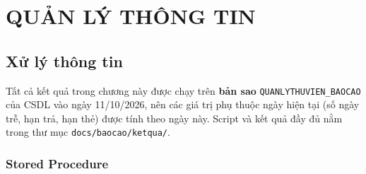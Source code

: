\documentclass[13pt,a4paper,oneside]{extreport}
\begin{document}
\chapter{QUẢN LÝ THÔNG TIN}
\section{Xử lý thông tin}
Tất cả kết quả trong chương này được chạy trên \textbf{bản sao} \texttt{QUANLYTHUVIEN\_BAOCAO} của CSDL vào ngày 11/10/2026, nên các giá trị phụ thuộc ngày hiện tại (số ngày trễ, hạn trả, hạn thẻ) được tính theo ngày này. Script và kết quả đầy đủ nằm trong thư mục \texttt{docs/baocao/ketqua/}.

\subsection{Stored Procedure}
\end{document}
